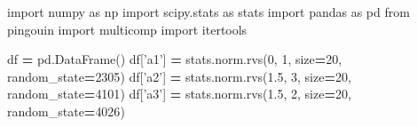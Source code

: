 \documentclass[polish,]{book}
\newenvironment{Shaded}{\begin{snugshade}}{\end{snugshade}}
\newcommand{\DecValTok}[1]{\textcolor[rgb]{0.00,0.00,0.81}{#1}}
\newcommand{\FloatTok}[1]{\textcolor[rgb]{0.00,0.00,0.81}{#1}}
\newcommand{\ImportTok}[1]{#1}
\newcommand{\NormalTok}[1]{#1}
\newcommand{\OperatorTok}[1]{\textcolor[rgb]{0.81,0.36,0.00}{\textbf{#1}}}
\newcommand{\StringTok}[1]{\textcolor[rgb]{0.31,0.60,0.02}{#1}}
\begin{document}
\begin{Shaded}
\begin{Highlighting}[]
\ImportTok{import}\NormalTok{ numpy }\ImportTok{as}\NormalTok{ np}
\ImportTok{import}\NormalTok{ scipy.stats }\ImportTok{as}\NormalTok{ stats}
\ImportTok{import}\NormalTok{ pandas }\ImportTok{as}\NormalTok{ pd}
\ImportTok{from}\NormalTok{ pingouin }\ImportTok{import}\NormalTok{ multicomp}
\ImportTok{import}\NormalTok{ itertools}

\NormalTok{df }\OperatorTok{=}\NormalTok{ pd.DataFrame()}
\NormalTok{df[}\StringTok{'a1'}\NormalTok{] }\OperatorTok{=}\NormalTok{ stats.norm.rvs(}\DecValTok{0}\NormalTok{, }\DecValTok{1}\NormalTok{, size}\OperatorTok{=}\DecValTok{20}\NormalTok{, random_state}\OperatorTok{=}\DecValTok{2305}\NormalTok{)}
\NormalTok{df[}\StringTok{'a2'}\NormalTok{] }\OperatorTok{=}\NormalTok{ stats.norm.rvs(}\FloatTok{1.5}\NormalTok{, }\DecValTok{3}\NormalTok{, size}\OperatorTok{=}\DecValTok{20}\NormalTok{, random_state}\OperatorTok{=}\DecValTok{4101}\NormalTok{)}
\NormalTok{df[}\StringTok{'a3'}\NormalTok{] }\OperatorTok{=}\NormalTok{ stats.norm.rvs(}\FloatTok{1.5}\NormalTok{, }\DecValTok{2}\NormalTok{, size}\OperatorTok{=}\DecValTok{20}\NormalTok{, random_state}\OperatorTok{=}\DecValTok{4026}\NormalTok{)}


\end{Highlighting}
\end{Shaded}
\end{document}
